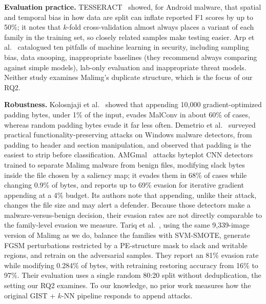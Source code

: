 \documentclass[conference]{IEEEtran}
\begin{document}
\textbf{Evaluation practice.} TESSERACT~\cite{pendlebury2019tesseract} showed, for
Android malware, that spatial and temporal bias in how data are split can inflate
reported F1 scores by up to 50\%; it notes that $k$-fold cross-validation almost always
places a variant of each family in the training set, so closely related samples make
testing easier. Arp et al.~\cite{arp2022dos} catalogued ten pitfalls of machine
learning in security, including sampling bias, data snooping, inappropriate baselines
(they recommend always comparing against simple models), lab-only evaluation and
inappropriate threat models. Neither study examines Malimg's duplicate structure,
which is the focus of our RQ2.

\textbf{Robustness.} Kolosnjaji et al.~\cite{kolosnjaji2018adversarial} showed that
appending 10,000 gradient-optimized padding bytes, under 1\% of the input, evades
MalConv in about 60\% of cases, whereas random padding bytes evade it far less often.
Demetrio et al.~\cite{demetrio2021exemples} surveyed practical functionality-preserving
attacks on Windows malware detectors, from padding to header and section
manipulation, and observed that padding is the easiest to strip before classification.
AMGmal~\cite{zhan2023amgmal} attacks byteplot CNN detectors trained to separate Malimg
malware from benign files, modifying slack bytes inside the file chosen by a saliency
map; it evades them in 68\% of cases while changing 0.9\% of bytes, and reports up to
69\% evasion for iterative gradient appending at a 4\% budget. Its authors note that
appending, unlike their attack, changes the file size and may alert a defender. Because
those detectors make a malware-versus-benign decision, their evasion rates are not
directly comparable to the family-level evasion we measure. Tariq et al.~\cite{tariq2026framework}, using the same
9,339-image version of Malimg as we do, balance the families with SVM-SMOTE, generate
FGSM perturbations restricted by a PE-structure mask to slack and writable regions,
and retrain on the adversarial samples. They report an 81\% evasion rate while
modifying 0.284\% of bytes, with retraining restoring accuracy from 16\% to 97\%.
Their evaluation uses a single random 80:20 split without deduplication, the setting
our RQ2 examines. To our knowledge, no prior work measures how the original GIST +
$k$-NN pipeline responds to append attacks.
\end{document}
